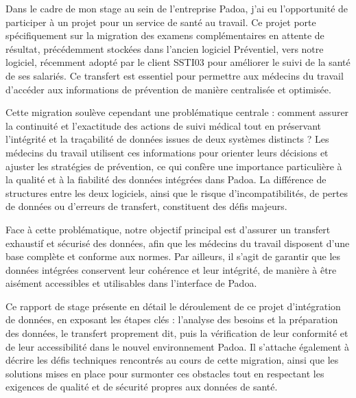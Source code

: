 
Dans le cadre de mon stage au sein de l'entreprise Padoa, j’ai eu l’opportunité de participer à un projet pour un service de santé au travail. Ce projet porte spécifiquement sur la migration des examens complémentaires  en attente de résultat, précédemment stockées dans l’ancien logiciel Préventiel, vers notre logiciel, récemment adopté par le client SSTI03 pour améliorer le suivi de la santé de ses salariés. Ce transfert est essentiel pour permettre aux médecins du travail d’accéder aux informations de prévention de manière centralisée et optimisée.

Cette migration soulève cependant une problématique centrale : comment assurer la continuité et l’exactitude des actions de suivi médical tout en préservant l’intégrité et la traçabilité de données issues de deux systèmes distincts ? Les médecins du travail utilisent ces informations pour orienter leurs décisions et ajuster les stratégies de prévention, ce qui confère une importance particulière à la qualité et à la fiabilité des données intégrées dans Padoa. La différence de structures entre les deux logiciels, ainsi que le risque d’incompatibilités, de pertes de données ou d’erreurs de transfert, constituent des défis majeurs. 

Face à cette problématique, notre objectif principal est d’assurer un transfert exhaustif et sécurisé des données, afin que les médecins du travail disposent d’une base complète et conforme aux normes. Par ailleurs, il s’agit de garantir que les données intégrées conservent leur cohérence et leur intégrité, de manière à être aisément accessibles et utilisables dans l’interface de Padoa.

Ce rapport de stage présente en détail le déroulement de ce projet d’intégration de données, en exposant les étapes clés : l’analyse des besoins et la préparation des données, le transfert proprement dit, puis la vérification de leur conformité et de leur accessibilité dans le nouvel environnement Padoa. Il s’attache également à décrire les défis techniques rencontrés au cours de cette migration, ainsi que les solutions mises en place pour surmonter ces obstacles tout en respectant les exigences de qualité et de sécurité propres aux données de santé.

\smallskip